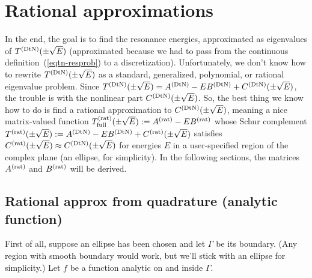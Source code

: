 \section{Rational approximations}
\label{sec-rat_approx}

In the end, the goal is to find the resonance energies,
approximated as eigenvalues of $T^{(\text{DtN})}(\pm\sqrt{E})$
(approximated because we had to pass from the continuous
definition~(\ref{eqtn-resprob}) to a discretization).
Unfortunately, we don't know how to rewrite
$T^{(\text{DtN})}(\pm\sqrt{E})$ as
a standard, generalized, polynomial, or rational
eigenvalue problem. Since $T^{(\text{DtN})}(\pm\sqrt{E})
= A^{(\text{DtN})} - E B^{(\text{DtN})} + C^{(\text{DtN})}(\pm\sqrt{E})$, the
trouble is with the nonlinear part $C^{(\text{DtN})}(\pm\sqrt{E})$.
So, the best thing we know how to do is
find a rational approximation to $C^{(\text{DtN})}(\pm\sqrt{E})$,
meaning a nice matrix-valued function 
$T^{(\text{rat})}_{\text{full}}(\pm\sqrt{E}) := A^{(\text{rat})} - EB^{(\text{rat})}$ 
whose Schur complement
$T^{(\text{rat})}(\pm\sqrt{E}) := A^{(\text{DtN})} - EB^{(\text{DtN})} + C^{(\text{rat})}(\pm\sqrt{E})$
satisfies $C^{(\text{rat})}(\pm\sqrt{E}) \approx C^{(\text{DtN})}(\pm\sqrt{E})$
for energies $E$ in a user-specified region of the complex plane
(an ellipse, for simplicity).
In the following sections, the matrices $A^{(\text{rat})}$ and
$B^{(\text{rat})}$ will be derived.

\subsection{Rational approx from quadrature (analytic function)}

First of all, suppose an ellipse has been chosen and let
$\Gamma$ be its boundary. (Any region with smooth
boundary would work, but we'll stick with an ellipse for
simplicity.) Let $f$ be a function analytic on and inside $\Gamma$.

